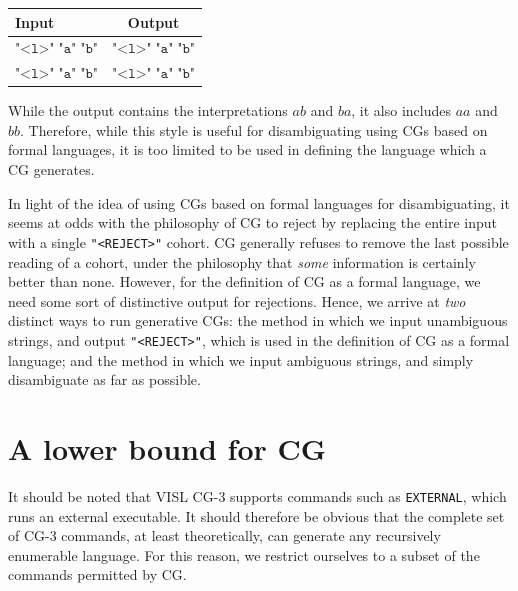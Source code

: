 \documentclass[11pt]{article}
\def\t#1{\texttt{#1}}
\begin{document}
\begin{center}
  \begin{tabular}{l|c}
    \textbf{Input}                  & \textbf{Output} \\ \hline
    \(\t{"<l>"}\;\t{"a"}\;\t{"b"}\) & \(\t{"<l>"}\;\t{"a"}\;\t{"b"}\) \\
    \(\t{"<l>"}\;\t{"a"}\;\t{"b"}\) & \(\t{"<l>"}\;\t{"a"}\;\t{"b"}\) \\
  \end{tabular}
\end{center}
While the output contains the interpretations $ab$ and $ba$, it also includes
$aa$ and $bb$. Therefore, while this style is useful for disambiguating using
CGs based on formal languages, it is too limited to be used in defining the
language which a CG generates.

In light of the idea of using CGs based on formal languages for disambiguating,
it seems at odds with the philosophy of CG to reject by replacing the entire
input with a single \t{"<REJECT>"} cohort. CG generally refuses to remove the
last possible reading of a cohort, under the philosophy that \emph{some}
information is certainly better than none.
However, for the definition of CG as a formal language, we need some sort of
distinctive output for rejections. Hence, we arrive at \emph{two} distinct ways
to run generative CGs: the method in which we input unambiguous strings, and
output \t{"<REJECT>"}, which is used in the definition of CG as a formal
language; and the method in which we input ambiguous strings, and simply
disambiguate as far as possible. 


\section{A lower bound for CG}
It should be noted that VISL CG-3 \cite{bick2015,vislcg3} supports commands 
such as \t{EXTERNAL}, which runs an external executable. It should therefore 
be obvious that the complete set of CG-3 commands, at least theoretically, 
can generate any recursively enumerable language. For this reason, we restrict 
ourselves to a subset of the commands permitted by CG.
\end{document}
